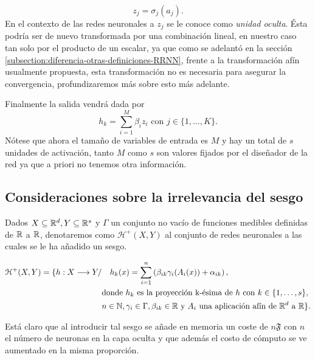 \begin{equation}
    z_j = \sigma_j(a_j).
\end{equation}
En el contexto de las redes neuronales a $z_j$ se le conoce como \textit{unidad oculta}. Ésta  podría ser de 
nuevo  transformada por una combinación lineal, en nuestro caso tan solo 
por el producto de un escalar, ya que como se adelantó en la sección \ref{subsection:diferencia-otras-definiciones-RRNN},
 frente a la transformación afín usualmente propuesta, esta transformación no es necesaria para asegurar la convergencia, profundizaremos más sobre esto más adelante. 

Finalmente la salida vendrá dada por
 \begin{equation}
    h_k = \sum_{i=1}^M \beta_ i z_i 
    \text{ con } j \in \{1, \ldots, K \}.
\end{equation}
Nótese que ahora el tamaño de variables de entrada es $M$
y hay un total de $s$ unidades de activación, tanto $M$ como $s$ son
valores fijados por el diseñador de la red ya que a priori no tenemos otra información. 
 
\subsection{Consideraciones sobre la irrelevancia del sesgo}
 Dados $X \subseteq \mathbb{R}^d, Y \subseteq \mathbb{R}^s$ y  $\Gamma$ un conjunto no vacío de funciones medibles definidas de $\mathbb{R}$ a $\mathbb{R}$, denotaremos como $\mathcal{H}^+(X,Y)$ al conjunto de redes neuronales a las cuales se le ha añadido un sesgo. 

\begin{align}
    \mathcal{H}^+(X,Y) 
    =
    \{
        h : X \longrightarrow Y 
        /& \quad 
        h_k(x) = 
        \sum_{i=1}^{n} \left( \beta_{i k} \gamma_{i}( A_{i}(x)) + \alpha_{i k} \right), \\
        & \text{donde  $h_k$  es la proyección k-ésima de $h$ con 
        $k \in \{1, \ldots, s\}$}, \\
        & n \in \mathbb{N},\gamma_{i} \in \Gamma , \beta_{i k} \in \mathbb{R}
         \text{ y }A_{i} \text{ una aplicación afín de $\mathbb{R}^d$ a $\mathbb{R}$}           
    \}.
\end{align}


Está claro que al introducir tal sesgo se añade en memoria 
un coste de $n \mathfrak{F}$ con $n$ el número de neuronas en la capa oculta y que además el costo de cómputo se ve aumentado en la misma proporción. 

